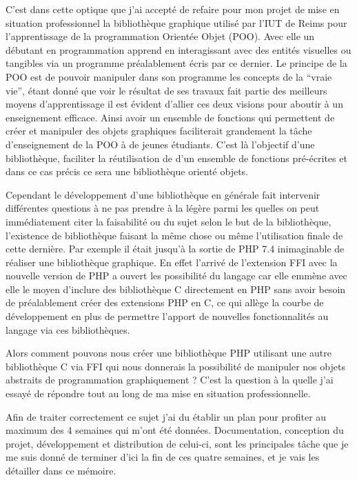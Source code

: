\documentclass[11pt,a4paper,krantz2,11pt,oneside]{krantz}
\begin{document}
C'est dans cette optique que j'ai accepté de refaire pour mon projet de mise en situation professionnel la bibliothèque graphique utilisé par l'IUT de Reims pour l'apprentissage de la programmation Orientée Objet (POO). Avec elle un débutant en programmation apprend en interagissant avec des entités visuelles ou tangibles via un programme préalablement écris par ce dernier. Le principe de la POO est de pouvoir manipuler dans son programme les concepts de la ``vraie vie'', étant donné que voir le résultat de ses travaux fait partie des meilleurs moyens d'apprentissage il est évident d'allier ces deux visions pour aboutir à un enseignement efficace. Ainsi avoir un ensemble de fonctions qui permettent de créer et manipuler des objets graphiques faciliterait grandement la tâche d'enseignement de la POO à de jeunes étudiants. C'est là l'objectif d'une bibliothèque, faciliter la réutilisation de d'un ensemble de fonctions pré-écrites et dans ce cas précis ce sera une bibliothèque orienté objets.

Cependant le développement d'une bibliothèque en générale fait intervenir différentes questions à ne pas prendre à la légère parmi les quelles on peut immédiatement citer la faisabilité ou du sujet selon le but de la bibliothèque, l'existence de bibliothèque faisant la même chose ou même l'utilisation finale de cette dernière. Par exemple il était jusqu'à la sortie de PHP 7.4 inimaginable de réaliser une bibliothèque graphique. En effet l'arrivé de l'extension FFI avec la nouvelle version de PHP a ouvert les possibilité du langage car elle emmène avec elle le moyen d'inclure des bibliothèque C directement en PHP sans avoir besoin de préalablement créer des extensions PHP en C, ce qui allège la courbe de développement en plus de permettre l'apport de nouvelles fonctionnalités au langage via ces bibliothèques.

Alors comment pouvons nous créer une bibliothèque PHP utilisant une autre bibliothèque C via FFI qui nous donnerais la possibilité de manipuler nos objets abstraits de programmation graphiquement ? C'est la question à la quelle j'ai essayé de répondre tout au long de ma mise en situation professionnelle.

Afin de traiter correctement ce sujet j'ai du établir un plan pour profiter au maximum des 4 semaines qui m'ont été données. Documentation, conception du projet, développement et distribution de celui-ci, sont les principales tâche que je me suis donné de terminer d'ici la fin de ces quatre semaines, et je vais les détailler dans ce mémoire.
\end{document}
